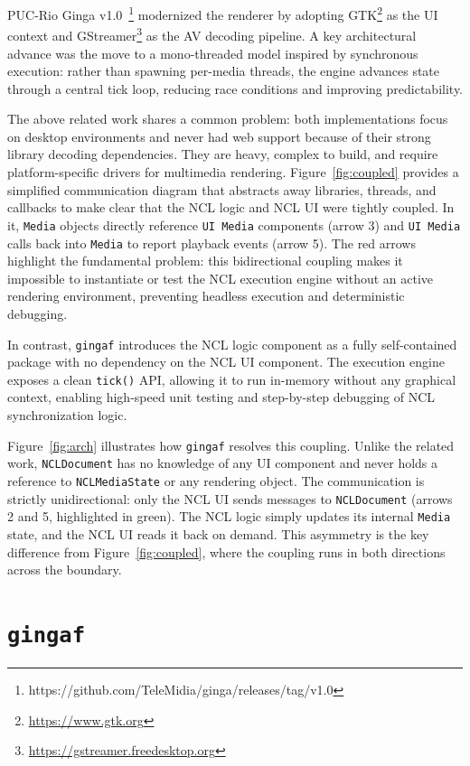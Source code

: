 \documentclass[sigconf,authorversion,review,authordraft]{acmart}
\newcommand{\projectname}{\texttt{gingaf}}
\begin{document}
PUC-Rio Ginga v1.0~\cite{dodsworth2018dynamic}\footnote{https://github.com/TeleMidia/ginga/releases/tag/v1.0} modernized the renderer by adopting GTK\footnote{\url{https://www.gtk.org}} as the UI context and GStreamer\footnote{\url{https://gstreamer.freedesktop.org}} as the AV decoding pipeline. A key architectural advance was the move to a mono-threaded model inspired by synchronous execution: rather than spawning per-media threads, the engine advances state through a central tick loop, reducing race conditions and improving predictability.

The above related work shares a common problem: both implementations focus on desktop environments and never had web support because of their strong library decoding dependencies. They are heavy, complex to build, and require platform-specific drivers for multimedia rendering. Figure~\ref{fig:coupled} provides a simplified communication diagram that abstracts away libraries, threads, and callbacks to make clear that the NCL logic and NCL UI were tightly coupled. In it, \texttt{Media} objects directly reference \texttt{UI Media} components (arrow 3) and \texttt{UI Media} calls back into \texttt{Media} to report playback events (arrow 5). The red arrows highlight the fundamental problem: this bidirectional coupling makes it impossible to instantiate or test the NCL execution engine without an active rendering environment, preventing headless execution and deterministic debugging.

In contrast, \projectname{} introduces the NCL logic component as a fully self-contained package with no dependency on the NCL UI component. The execution engine exposes a clean \texttt{tick()} API, allowing it to run in-memory without any graphical context, enabling high-speed unit testing and step-by-step debugging of NCL synchronization logic.

Figure~\ref{fig:arch} illustrates how \projectname{} resolves this coupling. Unlike the related work, \texttt{NCLDocument} has no knowledge of any UI component and never holds a reference to \texttt{NCLMediaState} or any rendering object. The communication is strictly unidirectional: only the NCL UI sends messages to \texttt{NCLDocument} (arrows 2 and 5, highlighted in green). The NCL logic simply updates its internal \texttt{Media} state, and the NCL UI reads it back on demand. This asymmetry is the key difference from Figure~\ref{fig:coupled}, where the coupling runs in both directions across the boundary.

\section{\projectname{}}
\end{document}
